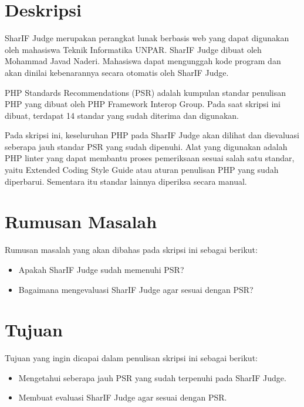 \documentclass[a4paper,twoside]{article}
\begin{document}
\title{\@judultopik}
\author{\nama \textendash \@npm} 

\newcommand{\nama}{Nicholas Khrisna Sandyawan}
\newcommand{\@npm}{6181801060}
\newcommand{\@judultopik}{Evaluasi PHP Standards Recommendations pada proyek SharIF Judge} %
\newcommand{\jumpemb}{1} %
\newcommand{\tanggal}{01/01/1900}


\maketitle


\section{Deskripsi}
SharIF Judge merupakan perangkat lunak berbasis web yang dapat digunakan oleh mahasiswa Teknik Informatika UNPAR. SharIF Judge dibuat oleh Mohammad Javad Naderi. Mahasiswa dapat mengunggah kode program dan akan dinilai kebenarannya secara otomatis oleh SharIF Judge.

PHP Standards Recommendations (PSR) adalah kumpulan standar penulisan PHP yang dibuat oleh PHP Framework Interop Group. Pada saat skripsi ini dibuat, terdapat 14 standar yang sudah diterima dan digunakan.

Pada skripsi ini, keseluruhan PHP pada SharIF Judge akan dilihat dan dievaluasi seberapa jauh standar PSR yang sudah dipenuhi. Alat yang digunakan adalah PHP linter yang dapat membantu proses pemeriksaan sesuai salah satu standar, yaitu Extended Coding Style Guide atau aturan penulisan PHP yang sudah diperbarui. Sementara itu standar lainnya diperiksa secara manual. 

\section{Rumusan Masalah}
Rumusan masalah yang akan dibahas pada skripsi ini sebagai berikut:
\begin{itemize}
	\item Apakah SharIF Judge sudah memenuhi PSR?
	\item Bagaimana mengevaluasi SharIF Judge agar sesuai dengan PSR?  
\end{itemize}

\section{Tujuan}
Tujuan yang ingin dicapai dalam penulisan skripsi ini sebagai berikut:
\begin{itemize}
	\item Mengetahui seberapa jauh PSR yang sudah terpenuhi pada SharIF Judge.
	\item Membuat evaluasi SharIF Judge agar sesuai dengan PSR.
\end{itemize}
\end{document}

